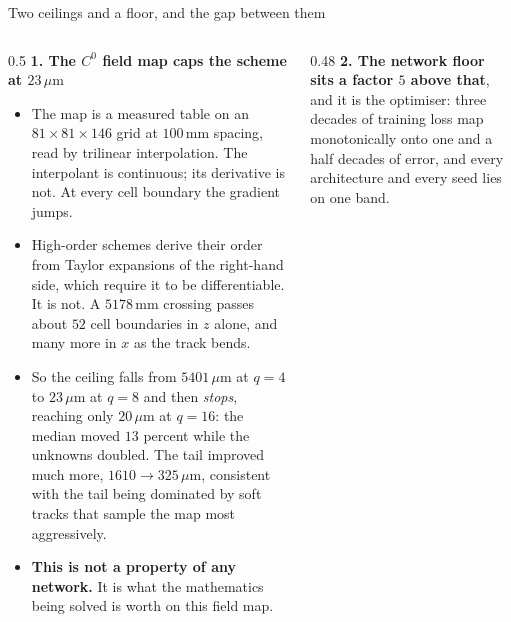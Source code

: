 \documentclass[aspectratio=169,10pt]{beamer}
\newcommand{\um}{\ensuremath{\,\mu\mathrm{m}}}
\newcommand{\mm}{\ensuremath{\,\mathrm{mm}}}
\newcommand{\hl}[1]{{\color{accent}\textbf{#1}}}
\begin{document}
\begin{frame}[shrink=25]{Two ceilings and a floor, and the gap between them}
  \vspace{1mm}
  \begin{columns}[T]
    \begin{column}{0.5\textwidth}
      \textbf{1. The $C^0$ field map caps the scheme at $23\um$}
      \begin{itemize}\small
        \item The map is a measured table on an $81 \times 81 \times 146$ grid
              at $100\mm$ spacing, read by trilinear interpolation. The
              interpolant is continuous; its derivative is not. At every cell
              boundary the gradient jumps.
        \item High-order schemes derive their order from Taylor expansions of
              the right-hand side, which require it to be differentiable. It is
              not. A $5178\mm$ crossing passes about $52$ cell boundaries in $z$
              alone, and many more in $x$ as the track bends.
        \item So the ceiling falls from $5401\um$ at $q = 4$ to $23\um$ at
              $q = 8$ and then \emph{stops}, reaching only $20\um$ at $q = 16$:
              the median moved $13$ percent while the unknowns doubled. The tail
              improved much more, $1610 \to 325\um$, consistent with the tail
              being dominated by soft tracks that sample the map most
              aggressively.
        \item \hl{This is not a property of any network.} It is what the
              mathematics being solved is worth on this field map.
      \end{itemize}
    \end{column}
    \begin{column}{0.48\textwidth}
      \textbf{2. The network floor sits a factor $5$ above that}, and it is the
      optimiser: three decades of training loss map monotonically onto one and a
      half decades of error, and every architecture and every seed lies on one
      band.
      \vspace{2mm}


\end{column}
\end{columns}
\end{frame}
\end{document}
